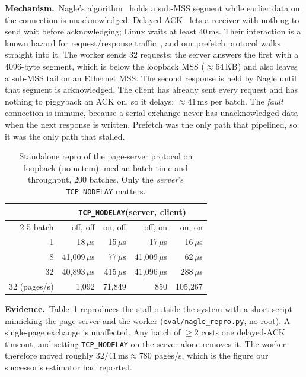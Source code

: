 \documentclass[conference]{IEEEtran}
\newcommand{\nd}{\texttt{TCP\_NODELAY}\xspace}
\newcommand{\us}{\,$\mu$s\xspace}
\begin{document}
\textbf{Mechanism.}\, Nagle's algorithm~\cite{rfc896} holds a sub-MSS segment
while earlier data on the connection is unacknowledged. Delayed
ACK~\cite{rfc1122} lets a receiver with nothing to send wait before
acknowledging; Linux waits at least 40\,ms. Their interaction is a known
hazard for request/response traffic~\cite{minshall2000pitfalls,
mogul2001rethinking}, and our prefetch protocol walks straight into it. The
worker sends 32 requests; the server answers the first with a 4096-byte
segment, which is below the loopback MSS (${\approx}64$\,KB) and also leaves a
sub-MSS tail on an Ethernet MSS. The second response is held by Nagle until
that segment is acknowledged. The client has already sent every request and
has nothing to piggyback an ACK on, so it delays: ${\approx}41$\,ms per batch.
The \emph{fault} connection is immune, because a serial exchange never has
unacknowledged data when the next response is written. Prefetch was the only
path that pipelined, so it was the only path that stalled.

\begin{table}[t]
\centering
\caption{Standalone repro of the page-server protocol on loopback (no netem):
median batch time and throughput, 200 batches. Only the \emph{server}'s
\nd matters.}
\label{tab:repro}
\small
\begin{tabular}{@{}rrrrr@{}}
\toprule
& \multicolumn{4}{c}{\nd (server, client)} \\
\cmidrule(l){2-5}
batch & off, off & on, off & off, on & on, on \\
\midrule
1  & 18\us      & 15\us     & 17\us      & 16\us \\
8  & 41{,}009\us & 77\us    & 41{,}009\us & 62\us \\
32 & 40{,}893\us & 415\us   & 41{,}096\us & 288\us \\
\midrule
32 (pages/s) & 1{,}092 & 71{,}849 & 850 & 105{,}267 \\
\bottomrule
\end{tabular}
\end{table}

\textbf{Evidence.}\, Table~\ref{tab:repro} reproduces the stall outside the
system with a short script mimicking the page server and the worker
(\texttt{eval/nagle\_repro.py}, no root). A single-page exchange is
unaffected. Any batch of $\ge2$ costs one delayed-ACK timeout, and setting
\nd on the server alone removes it. The worker therefore moved roughly
$32/41\,\text{ms}\approx780$ pages/s, which is the figure our successor's
estimator had reported.
\end{document}
